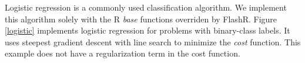 Logistic regression is a commonly used classification algorithm.
We implement this algorithm solely with the R \textit{base} functions
overriden by FlashR. Figure
\ref{logistic} implements logistic regression for problems with binary-class
labels. It uses steepest gradient descent with line search to minimize
the \textit{cost} function. This example does not have a regularization term
in the cost function.

